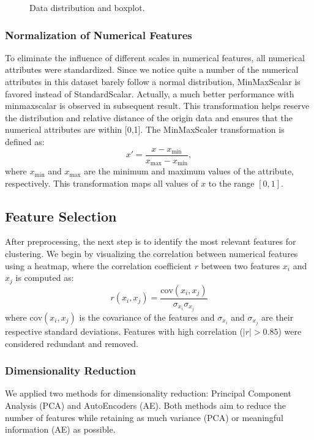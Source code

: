 \documentclass{article} %
\begin{document}
\begin{figure}[t]
\begin{subfigure}{.49\textwidth}
        \label{fig:boxplot}
        \vspace{-5pt}
    \end{subfigure}
    \caption{Data distribution and boxplot.}
    \label{fig:Boxplot}
    \vspace{-12pt}
 \end{figure}
 



\subsubsection{Normalization of Numerical Features}
To eliminate the influence of different scales in numerical features, all numerical attributes were standardized.
Since we notice quite a number of the numerical attributes in this dataset barely follow a normal distribution, MinMaxScalar is favored instead of StandardScalar.
Actually, a much better performance with minmaxscalar is observed in subsequent result.
This transformation helps reserve the distribution and relative distance of the origin data and ensures that the numerical attributes are within [0,1].
The {MinMaxScaler} transformation is defined as:
\[
    x' = \frac{x - x_{\min}}{x_{\max} - x_{\min}},
\]
where $x_{\min}$ and $x_{\max}$ are the minimum and maximum values of the attribute, respectively. This transformation maps all values of $x$ to the range $[0, 1]$.

\subsection{Feature Selection}
After preprocessing, the next step is to identify the most relevant features for clustering. We begin by visualizing the correlation between numerical features using a heatmap, where the correlation coefficient \( r \) between two features \( x_i \) and \( x_j \) is computed as:
$$
r(x_i, x_j) = \frac{\text{cov}(x_i, x_j)}{\sigma_{x_i} \sigma_{x_j}}
$$
where \( \text{cov}(x_i, x_j) \) is the covariance of the features and \( \sigma_{x_i} \) and \( \sigma_{x_j} \) are their respective standard deviations.
Features with high correlation (\( |r| > 0.85 \)) were considered redundant and removed.




\subsubsection{Dimensionality Reduction}
We applied two methods for dimensionality reduction: Principal Component Analysis (PCA) and AutoEncoders (AE). Both methods aim to reduce the number of features while retaining as much variance (PCA) or meaningful information (AE) as possible.
\end{document}
